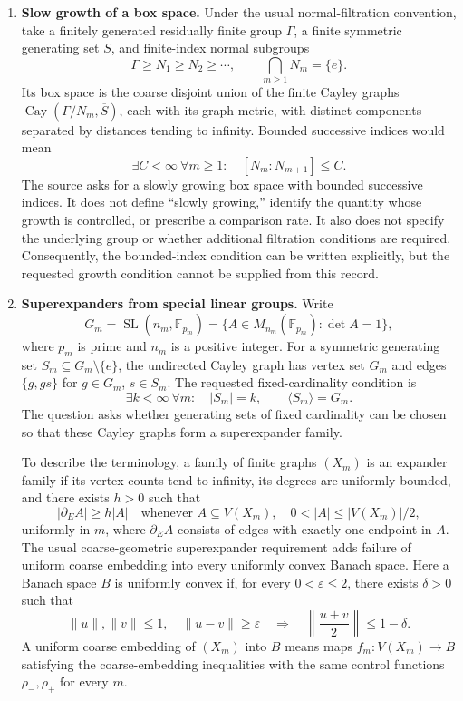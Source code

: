 \documentclass[11pt]{article}
\begin{document}
\begin{enumerate}
The source leaves unspecified the rank of \(\Gamma\), pointwise versus essential freeness, the dimension and compactness of \(M\), the metric, the measure, action regularity, the full-cone versus level-family convention, and the required meaning and metric compatibility of a wall structure. Thus these definitions explain the question but do not determine a unique precise existence assertion.

\item \textbf{Slow growth of a box space.} Under the usual normal-filtration convention, take a finitely generated residually finite group \(\Gamma\), a finite symmetric generating set \(S\), and finite-index normal subgroups
\[
\Gamma\geq N_1\geq N_2\geq\cdots,
\qquad \bigcap_{m\geq1}N_m=\{e\}.
\]
Its box space is the coarse disjoint union of the finite Cayley graphs \(\operatorname{Cay}(\Gamma/N_m,\overline S)\), each with its graph metric, with distinct components separated by distances tending to infinity. Bounded successive indices would mean
\[
\exists C<\infty\ \forall m\geq1:\quad [N_m:N_{m+1}]\leq C.
\]
The source asks for a slowly growing box space with bounded successive indices. It does not define ``slowly growing,'' identify the quantity whose growth is controlled, or prescribe a comparison rate. It also does not specify the underlying group or whether additional filtration conditions are required. Consequently, the bounded-index condition can be written explicitly, but the requested growth condition cannot be supplied from this record.

\item \textbf{Superexpanders from special linear groups.} Write
\[
G_m=\operatorname{SL}(n_m,\mathbb F_{p_m})
=\{A\in M_{n_m}(\mathbb F_{p_m}):\det A=1\},
\]
where \(p_m\) is prime and \(n_m\) is a positive integer. For a symmetric generating set \(S_m\subseteq G_m\setminus\{e\}\), the undirected Cayley graph has vertex set \(G_m\) and edges \(\{g,gs\}\) for \(g\in G_m\), \(s\in S_m\). The requested fixed-cardinality condition is
\[
\exists k<\infty\ \forall m:\quad |S_m|=k,
\qquad \langle S_m\rangle=G_m.
\]
The question asks whether generating sets of fixed cardinality can be chosen so that these Cayley graphs form a superexpander family.

To describe the terminology, a family of finite graphs \((X_m)\) is an expander family if its vertex counts tend to infinity, its degrees are uniformly bounded, and there exists \(h>0\) such that
\[
|\partial_E A|\geq h|A|
\quad\text{whenever }A\subseteq V(X_m),\quad
0<|A|\leq |V(X_m)|/2,
\]
uniformly in \(m\), where \(\partial_E A\) consists of edges with exactly one endpoint in \(A\). The usual coarse-geometric superexpander requirement adds failure of uniform coarse embedding into every uniformly convex Banach space. Here a Banach space \(B\) is uniformly convex if, for every \(0<\varepsilon\leq2\), there exists \(\delta>0\) such that
\[
\|u\|,\|v\|\leq1,\quad\|u-v\|\geq\varepsilon
\quad\Longrightarrow\quad
\left\|\frac{u+v}{2}\right\|\leq1-\delta.
\]
A uniform coarse embedding of \((X_m)\) into \(B\) means maps \(f_m:V(X_m)\to B\) satisfying the coarse-embedding inequalities with the same control functions \(\rho_-,\rho_+\) for every \(m\).


\end{enumerate}
\end{document}
